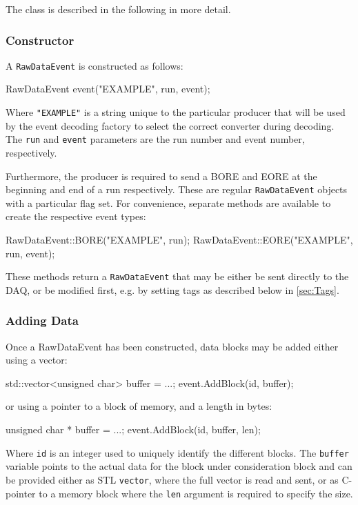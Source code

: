 The class is described in the following in more detail.

\subsubsection{Constructor}
A \texttt{RawDataEvent} is constructed as follows:
\begin{listing}
RawDataEvent event("EXAMPLE", run, event);
\end{listing}

Where \texttt{"EXAMPLE"} is a string unique to the particular producer
that will be used by the event decoding factory to select the correct converter during decoding.
The \texttt{run} and \texttt{event} parameters are the run number
and event number, respectively.

Furthermore, the producer is required to send a \gls{BORE}
and \gls{EORE} at the beginning and end of a run respectively.
These are regular \texttt{RawDataEvent} objects with a particular flag set.
For convenience, separate methods are available to create the respective event types:
\begin{listing}
RawDataEvent::BORE("EXAMPLE", run);
RawDataEvent::EORE("EXAMPLE", run, event);
\end{listing}

These methods return a \texttt{RawDataEvent} that may be either be sent directly to the DAQ,
or be modified first, e.g. by setting tags as described below in \autoref{sec:Tags}.

\subsubsection{Adding Data}
Once a RawDataEvent has been constructed,
data blocks may be added either using a vector:
\begin{listing}
std::vector<unsigned char> buffer = ...;
event.AddBlock(id, buffer);
\end{listing}

or using a pointer to a block of memory, and a length in bytes:
\begin{listing}
unsigned char * buffer = ...;
event.AddBlock(id, buffer, len);
\end{listing}

Where \texttt{id} is an integer used to uniquely identify the different blocks.
The \texttt{buffer} variable points to the actual data for the block under consideration block and can be provided either as STL \texttt{vector}, where the full vector is read and sent, or as C-pointer to a memory block where the \texttt{len} argument is required to specify the size.

